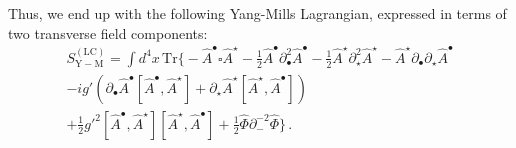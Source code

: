 \documentclass[english,american]{article}
\begin{document}
Thus, we end up with the following Yang-Mills Lagrangian, expressed
in terms of two transverse field components:
\begin{multline}
S_{\mathrm{Y-M}}^{\left(\mathrm{LC}\right)}=\int d^{4}x\,\mathrm{Tr}\Bigg\{-\hat{A}^{\bullet}\square\hat{A}^{\star}-\frac{1}{2}\hat{A}^{\bullet}\partial_{\bullet}^{2}\hat{A}^{\bullet}-\frac{1}{2}\hat{A}^{\star}\partial_{\star}^{2}\hat{A}^{\star}-\hat{A}^{\star}\partial_{\bullet}\partial_{\star}\hat{A}^{\bullet}\\
-ig'\left(\partial_{\bullet}\hat{A}^{\bullet}\left[\hat{A}^{\bullet},\hat{A}^{\star}\right]+\partial_{\star}\hat{A}^{\star}\left[\hat{A}^{\star},\hat{A}^{\bullet}\right]\right)\\
+\frac{1}{2}g'^{2}\left[\hat{A}^{\bullet},\hat{A}^{\star}\right]\left[\hat{A}^{\star},\hat{A}^{\bullet}\right]+\frac{1}{2}\hat{\Phi}\partial_{-}^{-2}\hat{\Phi}\Bigg\}\,.\label{eq:Action_LC}
\end{multline}
\end{document}
